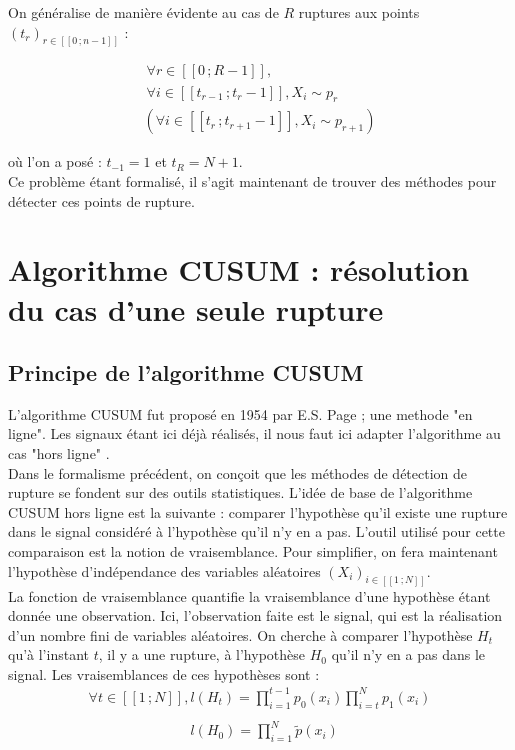 \documentclass[french,11pt,notitlepage]{report}
\begin{document}
	On généralise de manière évidente au cas de $R$ ruptures aux points $(t_r)_{r \in [\![0\,; n-1]\!]}$ :
	
	\begin{equation}
	\begin{array}{lll}
		~ \forall r \in [\![0\,; R-1]\!], \\
		~ \forall i \in [\![t_{r-1}\,; t_r-1]\!], X_i \sim p_r \\
		( \forall i \in [\![t_r\,; t_{r+1}-1]\!], X_i \sim p_{r+1} )
	\end{array}
	\label{multi_rupt}
	\end{equation}
	
	où l'on a posé : $t_{-1} = 1$ et $t_R = N+1$.
	\\
	
	Ce problème étant formalisé, il s'agit maintenant de trouver des méthodes pour détecter ces points de rupture.
	
	
	
	\chapter{Algorithme CUSUM : résolution du cas d'une seule rupture}
	
	
	
	\section{Principe de l'algorithme CUSUM}
	
	
	L'algorithme CUSUM fut proposé en 1954 par E.S. Page \cite{CIS} ; une methode "en ligne".
	Les signaux étant ici déjà réalisés, il nous faut ici adapter l'algorithme au cas "hors ligne" \cite{DAC}.
	\\
	
	Dans le formalisme précédent, on conçoit que les méthodes de détection de rupture se fondent sur des outils statistiques.
	L'idée de base de l'algorithme CUSUM hors ligne est la suivante :
	comparer l'hypothèse qu'il existe une rupture dans le signal considéré à l'hypothèse qu'il n'y en a pas.
	L'outil utilisé pour cette comparaison est la notion de vraisemblance.
	Pour simplifier, on fera maintenant l'hypothèse d'indépendance des variables aléatoires $(X_i)_{i \in [\![1\,; N]\!]}$.
	\\
	
	La fonction de vraisemblance quantifie la vraisemblance d'une hypothèse étant donnée une observation.
	Ici, l'observation faite est le signal, qui est la réalisation d'un nombre fini de variables aléatoires.
	On cherche à comparer l'hypothèse $H_t$ qu'à l'instant $t$, il y a une rupture, à l'hypothèse $H_0$ qu'il n'y en a pas dans le signal.
	Les vraisemblances de ces hypothèses sont :
	\begin{equation}
	\begin{array}{ll}
		\forall t \in [\![1\,; N]\!], l(H_t) = \prod_{i = 1}^{t-1} p_0(x_i) \prod_{i = t}^{N} p_1(x_i) \\\\
		\phantom{\forall t \in [\![1\,; N]\!], }l(H_0) = \prod_{i = 1}^N\tilde p(x_i) \\
	\end{array}	
	\end{equation}
	
\end{document}
